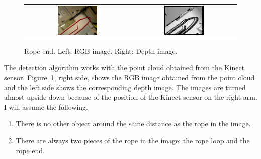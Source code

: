             \begin{figure}
                \centering
                \begin{tabular}{cc}
                \includegraphics[width=0.39\textwidth]{rgb_red.png}
                &
                \includegraphics[width=0.39\textwidth]{depth_red.png}
                \end{tabular}
                \caption{Rope end. Left: RGB image. Right: Depth image.}
                \label{fig:RopeEndRgbAndDepth}
            \end{figure}

            The detection algorithm works with the point cloud obtained from the Kinect sensor. Figure~\ref{fig:RopeEndRgbAndDepth}, right side, shows the RGB image obtained from the point cloud and the left side shows the corresponding depth image. The images are turned almost upside down because of the position of the Kinect sensor on the right arm. I will assume the following.
%
            \begin{enumerate}\itemsep0pt
                \item There is no other object around the same distance as the rope in the image.
                \item There are always two pieces of the rope in the image: the rope loop and the rope end.
            \end{enumerate}


